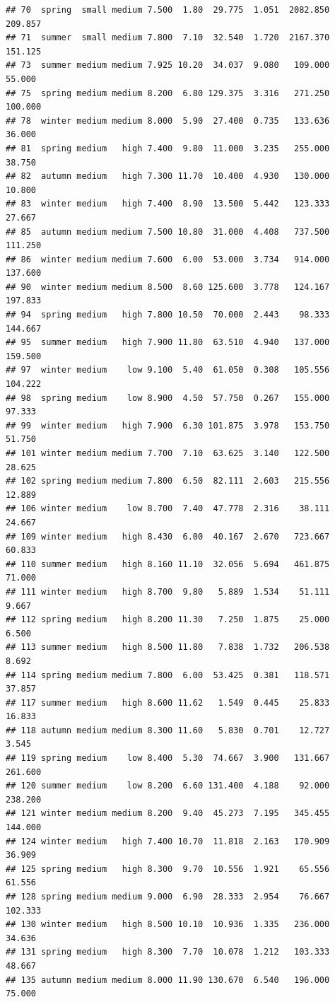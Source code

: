 \documentclass[]{report}
\begin{document}
\begin{verbatim}
## 70  spring  small medium 7.500  1.80  29.775  1.051  2082.850 209.857
## 71  summer  small medium 7.800  7.10  32.540  1.720  2167.370 151.125
## 73  summer medium medium 7.925 10.20  34.037  9.080   109.000  55.000
## 75  spring medium medium 8.200  6.80 129.375  3.316   271.250 100.000
## 78  winter medium medium 8.000  5.90  27.400  0.735   133.636  36.000
## 81  spring medium   high 7.400  9.80  11.000  3.235   255.000  38.750
## 82  autumn medium   high 7.300 11.70  10.400  4.930   130.000  10.800
## 83  winter medium   high 7.400  8.90  13.500  5.442   123.333  27.667
## 85  autumn medium medium 7.500 10.80  31.000  4.408   737.500 111.250
## 86  winter medium medium 7.600  6.00  53.000  3.734   914.000 137.600
## 90  winter medium medium 8.500  8.60 125.600  3.778   124.167 197.833
## 94  spring medium   high 7.800 10.50  70.000  2.443    98.333 144.667
## 95  summer medium   high 7.900 11.80  63.510  4.940   137.000 159.500
## 97  winter medium    low 9.100  5.40  61.050  0.308   105.556 104.222
## 98  spring medium    low 8.900  4.50  57.750  0.267   155.000  97.333
## 99  winter medium   high 7.900  6.30 101.875  3.978   153.750  51.750
## 101 winter medium medium 7.700  7.10  63.625  3.140   122.500  28.625
## 102 spring medium medium 7.800  6.50  82.111  2.603   215.556  12.889
## 106 winter medium    low 8.700  7.40  47.778  2.316    38.111  24.667
## 109 winter medium   high 8.430  6.00  40.167  2.670   723.667  60.833
## 110 summer medium   high 8.160 11.10  32.056  5.694   461.875  71.000
## 111 winter medium   high 8.700  9.80   5.889  1.534    51.111   9.667
## 112 spring medium   high 8.200 11.30   7.250  1.875    25.000   6.500
## 113 summer medium   high 8.500 11.80   7.838  1.732   206.538   8.692
## 114 spring medium medium 7.800  6.00  53.425  0.381   118.571  37.857
## 117 summer medium   high 8.600 11.62   1.549  0.445    25.833  16.833
## 118 autumn medium medium 8.300 11.60   5.830  0.701    12.727   3.545
## 119 spring medium    low 8.400  5.30  74.667  3.900   131.667 261.600
## 120 summer medium    low 8.200  6.60 131.400  4.188    92.000 238.200
## 121 winter medium medium 8.200  9.40  45.273  7.195   345.455 144.000
## 124 winter medium   high 7.400 10.70  11.818  2.163   170.909  36.909
## 125 spring medium   high 8.300  9.70  10.556  1.921    65.556  61.556
## 128 spring medium medium 9.000  6.90  28.333  2.954    76.667 102.333
## 130 winter medium   high 8.500 10.10  10.936  1.335   236.000  34.636
## 131 spring medium   high 8.300  7.70  10.078  1.212   103.333  48.667
## 135 autumn medium medium 8.000 11.90 130.670  6.540   196.000  75.000

\end{verbatim}
\end{document}
